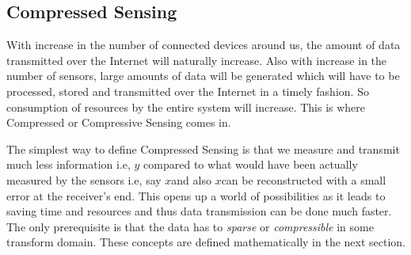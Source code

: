 \documentclass[12pt]{article}
\theoremstyle{definition}
\def\x{$x$\hspace{0.1in}}
\def\y{$y$\hspace{0.1in}}
\begin{document}
  \subsection{Compressed Sensing}
  With increase in the number of connected devices around us, the amount of data transmitted over the Internet will naturally
  increase. Also with increase in the number of sensors, large amounts of data will be generated which will have to be 
  processed, stored and transmitted over the Internet in a timely fashion. So consumption of resources by the entire system
  will increase. This is where Compressed or Compressive Sensing comes in. 
  \par The simplest way to define Compressed Sensing is that we measure and transmit much less information i.e, \y 
  compared to what would have been actually measured by the sensors i.e, say \x and also \x can be reconstructed with a 
  small error at the receiver's end.
  This opens up a world of possibilities as it leads to saving time and resources and thus data transmission can be done
  much faster. The only prerequisite is that the data has to \textit{sparse} or \textit{compressible}
  in some transform domain. These concepts
  are defined mathematically in the next section.
%  
\end{document}
